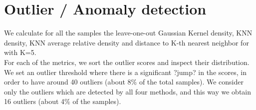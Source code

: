 \chapter*{Outlier / Anomaly detection}
\setcounter{chapter}{3}

We calculate for all the samples the leave-one-out Gaussian Kernel density, KNN density, KNN average relative density and distance to K-th nearest neighbor for with K=5.\\
For each of the metrics, we sort the outlier scores and inspect their distribution. We set an outlier threshold where there is a significant ?jump? in the scores, in order to have around 40 outliers (about 8\% of the total samples). We consider only the outliers which are detected by all four methods, and this way we obtain 16 outliers (about 4\% of the samples).
